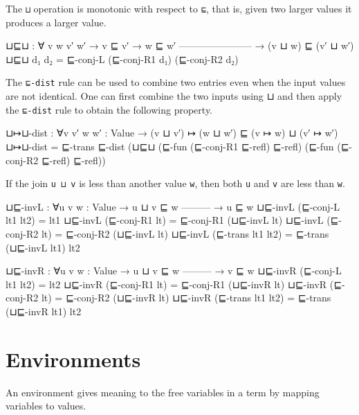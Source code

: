 The \texttt{⊔} operation is monotonic with respect to \texttt{⊑}, that
is, given two larger values it produces a larger value.

\begin{fence}
\begin{code}
⊔⊑⊔ : ∀ {v w v′ w′}
  → v ⊑ v′  →  w ⊑ w′
    -----------------------
  → (v ⊔ w) ⊑ (v′ ⊔ w′)
⊔⊑⊔ d₁ d₂ = ⊑-conj-L (⊑-conj-R1 d₁) (⊑-conj-R2 d₂)
\end{code}
\end{fence}

The \texttt{⊑-dist} rule can be used to combine two entries even when
the input values are not identical. One can first combine the two inputs
using ⊔ and then apply the \texttt{⊑-dist} rule to obtain the following
property.

\begin{fence}
\begin{code}
⊔↦⊔-dist : ∀{v v′ w w′ : Value}
  → (v ⊔ v′) ↦ (w ⊔ w′) ⊑ (v ↦ w) ⊔ (v′ ↦ w′)
⊔↦⊔-dist = ⊑-trans ⊑-dist (⊔⊑⊔ (⊑-fun (⊑-conj-R1 ⊑-refl) ⊑-refl)
                            (⊑-fun (⊑-conj-R2 ⊑-refl) ⊑-refl))
\end{code}
\end{fence}

If the join \texttt{u\ ⊔\ v} is less than another value \texttt{w}, then
both \texttt{u} and \texttt{v} are less than \texttt{w}.

\begin{fence}
\begin{code}
⊔⊑-invL : ∀{u v w : Value}
  → u ⊔ v ⊑ w
    ---------
  → u ⊑ w
⊔⊑-invL (⊑-conj-L lt1 lt2) = lt1
⊔⊑-invL (⊑-conj-R1 lt) = ⊑-conj-R1 (⊔⊑-invL lt)
⊔⊑-invL (⊑-conj-R2 lt) = ⊑-conj-R2 (⊔⊑-invL lt)
⊔⊑-invL (⊑-trans lt1 lt2) = ⊑-trans (⊔⊑-invL lt1) lt2

⊔⊑-invR : ∀{u v w : Value}
  → u ⊔ v ⊑ w
    ---------
  → v ⊑ w
⊔⊑-invR (⊑-conj-L lt1 lt2) = lt2
⊔⊑-invR (⊑-conj-R1 lt) = ⊑-conj-R1 (⊔⊑-invR lt)
⊔⊑-invR (⊑-conj-R2 lt) = ⊑-conj-R2 (⊔⊑-invR lt)
⊔⊑-invR (⊑-trans lt1 lt2) = ⊑-trans (⊔⊑-invR lt1) lt2
\end{code}
\end{fence}

\hypertarget{environments}{%
\section{Environments}\label{environments}}

An environment gives meaning to the free variables in a term by mapping
variables to values.

